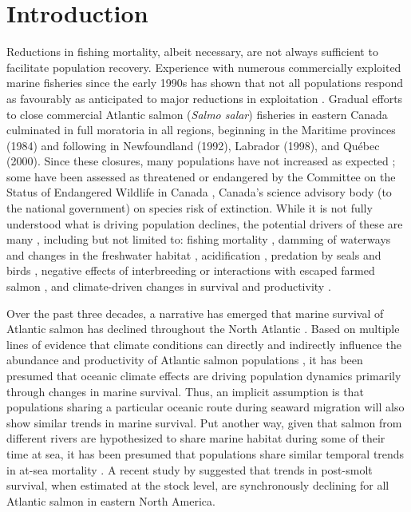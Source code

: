 \documentclass[12pt]{article}
\begin{document}

\section*{Introduction} %


Reductions in fishing mortality, albeit necessary, are not always sufficient
to facilitate population recovery. Experience with numerous commercially
exploited marine fisheries since the early 1990s has shown that not all
populations respond as favourably as anticipated to major reductions in
exploitation \citep{Hutchings2017}. Gradual efforts to close commercial
Atlantic salmon (\emph{Salmo salar}) fisheries in eastern Canada culminated in
full moratoria in all regions, beginning in the Maritime provinces (1984) and
following in Newfoundland (1992), Labrador (1998), and Qu\'{e}bec (2000). Since
these closures, many populations have not increased as 
expected \citep{Dempson2004, ICES2019}; some 
have been assessed as threatened or endangered by the 
Committee on the Status of Endangered Wildlife in Canada \citep[][]{Cosewic2010}, 
Canada's science advisory body (to the national government) on
species risk of extinction.
While it is not fully understood what is driving population declines, the potential
drivers of these are many \citep[see ][for a detailed discussion of possible
causes]{Cairns2001}, including but not limited to: fishing mortality \citep{Dempson2004}, 
damming of waterways and changes in the freshwater habitat \citep{Dunfield1985,Clarke2014a}, 
acidification \citep[particularly in Nova Scotia's Southern Uplands, see][]{Gibson2010}, 
predation by seals and birds \citep{Cairns2000}, negative
effects of interbreeding or interactions with escaped farmed salmon
\citep{Keyser2018}, and climate-driven changes in survival and productivity \citep{Mills2013}.

Over the past three decades, a narrative has emerged that marine survival of
Atlantic salmon has declined throughout the North Atlantic \citep{ICES2019}.
Based on multiple lines of evidence that climate conditions can directly and
indirectly influence the abundance and productivity of Atlantic salmon
populations \citep{Mills2013,Almodovar2019}, it has been presumed that oceanic climate effects are
driving population dynamics primarily through changes in marine survival.
Thus, an implicit assumption is that populations sharing a particular oceanic
route during seaward migration will also show similar trends in marine
survival. 
Put another way, given that salmon from different rivers 
are hypothesized to share marine habitat during some of their time at sea, it
has been presumed that populations share similar temporal trends in
at-sea mortality \citep{Friedland1993, Friedland1998, Russell2012}.  
A recent study by \citet{Olmos2019} suggested that trends in post-smolt
survival, when estimated at the stock level, are synchronously declining
for all Atlantic salmon in eastern North America.
\end{document}
